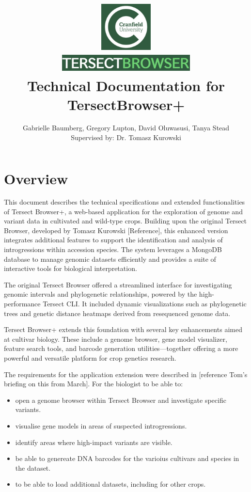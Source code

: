 \documentclass[12pt]{article}
\title{
{\includegraphics[width=3cm, height=2.5cm]{Cran.jpg}}
\\
\includegraphics[width=7cm, height=1cm]{TB.jpg}
\\
{Technical Documentation for TersectBrowser+}
}
\author{Gabrielle Baumberg, Gregory Lupton, David Oluwasusi, Tanya Stead \\ Supervised by: Dr. Tomasz Kurowski}
\begin{document}
\sloppy %

\maketitle

\section{Overview}
This document describes the technical specifications and extended functionalities of Tersect Browser+, a web-based application for the exploration of genome and variant data in cultivated and wild-type crops. Building upon the original Tersect Browser, developed by Tomasz Kurowski [Reference], this enhanced version integrates additional features to support the identification and analysis of introgressions within accession species. The system leverages a MongoDB database to manage genomic datasets efficiently and provides a suite of interactive tools for biological interpretation.

The original Tersect Browser offered a streamlined interface for investigating genomic intervals and phylogenetic relationships, powered by the high-performance Tersect CLI. It included dynamic visualizations such as phylogenetic trees and genetic distance heatmaps derived from resequenced genome data.

Tersect Browser+ extends this foundation with several key enhancements aimed at cultivar biology. These include a genome browser, gene model visualizer, feature search tools, and barcode generation utilities—together offering a more powerful and versatile platform for crop genetics research.

The requirements for the application extension were described in [reference Tom’s briefing on this from March]. For the biologist to be able to:  

\begin{itemize}
    \item open a genome browser within Tersect Browser and investigate specific variants.
    \item visualise gene models in areas of suspected introgressions.
    \item identify areas where high-impact variants are visible. 
    \item be able to genereate DNA barcodes for the varioius cultivars and species in the dataset. 
    \item to be able to load additional datasets, including for other crops. 
\end{itemize}
\end{document}
